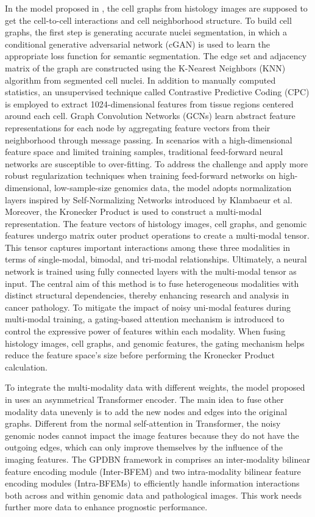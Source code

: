 \documentclass[journal,twoside,web]{ieeecolor}
\begin{document}
In the model proposed in \cite{chen2020pathomic}, the cell graphs from histology images are supposed to get the cell-to-cell interactions and cell neighborhood structure.
To build cell graphs, the first step is generating accurate nuclei segmentation, in which a conditional generative adversarial network (cGAN) is used to learn the appropriate loss function for semantic segmentation.
The edge set and adjacency matrix of the graph are constructed using the K-Nearest Neighbors (KNN) algorithm from segmented cell nuclei.
In addition to manually computed statistics, an unsupervised technique called Contrastive Predictive Coding (CPC) is employed to extract 1024-dimensional features from tissue regions centered around each cell.
Graph Convolution Networks (GCNs) learn abstract feature representations for each node by aggregating feature vectors from their neighborhood through message passing.
In scenarios with a high-dimensional feature space and limited training samples, traditional feed-forward neural networks are susceptible to over-fitting. 
To address the challenge and apply more robust regularization techniques when training feed-forward networks on high-dimensional, low-sample-size genomics data, the model adopts normalization layers inspired by Self-Normalizing Networks introduced by Klambaeur et al\cite{klambauer2017self}.
Moreover, the Kronecker Product is used to construct a multi-modal representation. 
The feature vectors of histology images, cell graphs, and genomic features undergo matrix outer product operations to create a multi-modal tensor. 
This tensor captures important interactions among these three modalities in terms of single-modal, bimodal, and tri-modal relationships.
Ultimately, a neural network is trained using fully connected layers with the multi-modal tensor as input. 
The central aim of this method is to fuse heterogeneous modalities with distinct structural dependencies, thereby enhancing research and analysis in cancer pathology. 
To mitigate the impact of noisy uni-modal features during multi-modal training, a gating-based attention mechanism\cite{arevalo2017gated} is introduced to control the expressive power of features within each modality. 
When fusing histology images, cell graphs, and genomic features, the gating mechanism helps reduce the feature space's size before performing the Kronecker Product calculation.

To integrate the multi-modality data with different weights, the model proposed in \cite{wang2021ammasurv} uses an asymmetrical Transformer encoder.
The main idea to fuse other modality data unevenly is to add the new nodes and edges into the original graphs.
Different from the normal self-attention in Transformer, the noisy genomic nodes cannot impact the image features because they do not have the outgoing edges, which can only improve themselves by the influence of the imaging features.
The GPDBN framework in \cite{wang2021gpdbn} comprises an inter-modality bilinear feature encoding module (Inter-BFEM) and two intra-modality bilinear feature encoding modules (Intra-BFEMs) to efficiently handle information interactions both across and within genomic data and pathological images.
This work needs further more data to enhance prognostic performance.
\end{document}
